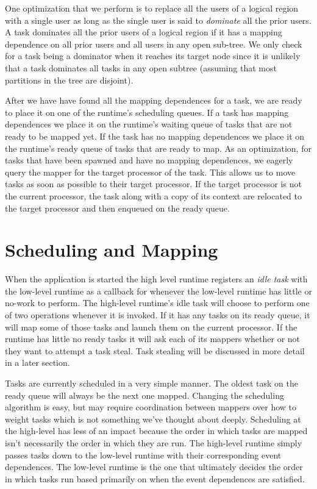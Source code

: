One optimization that we perform is to replace all the users of a logical region with a single user 
as long as the single user is said to {\em dominate} all the prior users.  A task dominates all the prior 
users of a logical region if it has a mapping dependence on all prior users and all users in any 
open sub-tree.  We only check for a task being a dominator when it reaches its target node since 
it is unlikely that a task dominates all tasks in any open subtree (assuming that most partitions 
in the tree are disjoint).

After we have have found all the mapping dependences for a task, we are ready to place it on one of 
the runtime's scheduling queues.  If a task has mapping dependences we place it on the runtime's 
waiting queue of tasks that are not ready to be mapped yet.  If the task has no mapping dependences 
we place it on the runtime's ready queue of tasks that are ready to map.  As an optimization, for 
tasks that have been spawned and have no mapping dependences, we eagerly query the mapper 
for the target processor of the task.  This allows us to move tasks as soon as possible to their 
target processor.  If the target processor is not the current processor, the task along with a copy 
of its context are relocated to the target processor and then enqueued on the ready queue.

\section{Scheduling and Mapping}
When the application is started the high level runtime registers an {\em idle task} with the low-level 
runtime as a callback for whenever the low-level runtime has little or no-work to perform.  The 
high-level runtime's idle task will choose to perform one of two operations whenever it is invoked.  
If it has any tasks on its ready queue, it will map some of those tasks and launch them on the current 
processor.  If the runtime has little no ready tasks it will ask each of its mappers whether or 
not they want to attempt a task steal.  Task stealing will be discussed in more detail in a 
later section.

Tasks are currently scheduled in a very simple manner.  The oldest task on the ready queue 
will always be the next one mapped.  Changing the scheduling algorithm is easy, but may require 
coordination between mappers over how to weight tasks which is not something we've thought about 
deeply.  Scheduling at the high-level has less of an impact because the order in which tasks are 
mapped isn't necessarily the order in which they are run.  The high-level runtime simply passes 
tasks down to the low-level runtime with their corresponding event dependences.  The low-level 
runtime is the one that ultimately decides the order in which tasks run based primarily on when 
the event dependences are satisfied.


